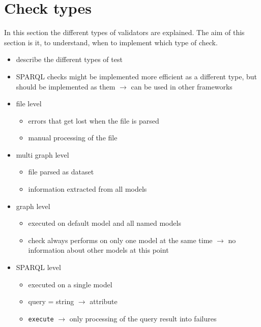 \documentclass[11pt,a4paper]{article}
\newcommand{\function}[1]{\texttt{#1}}
\begin{document}
\section{Check types}
\label{sec:check_types}
%
In this section the different types of validators are explained. 
The aim of this section is it, to understand, when to implement which type of check. 
\begin{itemize}
	\item describe the different types of test
	\item SPARQL checks might be implemented more efficient as a different type, but should be implemented as them $\rightarrow$ can be used in other frameworks
	\item file level
	\begin{itemize}
		\item errors that get lost when the file is parsed
		\item manual processing of the file
	\end{itemize}	 
	\item multi graph level 
	\begin{itemize}
		\item file parsed as dataset
		\item information extracted from all models 
	\end{itemize}
	\item graph level 
	\begin{itemize}
		\item executed on default model and all named models
		\item check always performs on only one model at the same time $\rightarrow$ no information about other models at this point
	\end{itemize}
	\item SPARQL level
	\begin{itemize}
		\item executed on a single model 
		\item query = string $\rightarrow$ attribute
		\item \function{execute} $\rightarrow$ only processing of the query result into failures
	\end{itemize}		 
\end{itemize}
%
\end{document}
